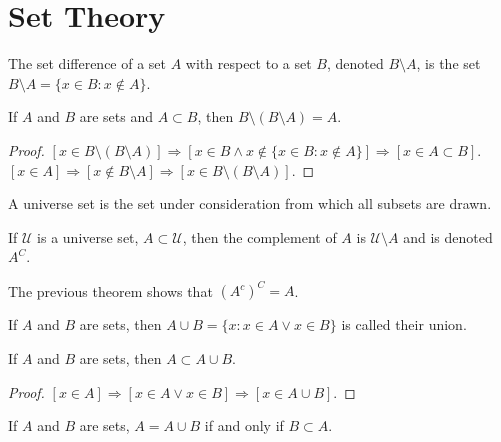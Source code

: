         \section{Set Theory}
            \begin{definition}
                The set difference of a set $A$ with respect
                to a set $B$, denoted $B\setminus{A}$, is the set
                $B\setminus{A}=\{x\in{B}:x\notin{A}\}$.
            \end{definition}
            \begin{theorem}
                If $A$ and $B$ are sets and $A\subset B$,
                then $B\setminus(B\setminus A)=A$.
            \end{theorem}
            \begin{proof}
                $[x\in B\setminus(B\setminus{A})]%
                 \Rightarrow[x\in{B}\land{x}\notin%
                 \{x\in{B}:x\notin{A}\}]%
                 \Rightarrow[x\in{A}\subset{B}]$.
                 $[x\in{A}]\Rightarrow[x\notin{B}\setminus{A}]%
                 \Rightarrow[x\in{B}\setminus(B\setminus{A})]$.
            \end{proof}
            A universe set is the set under consideration
            from which all subsets are drawn.
            \begin{definition}
                If $\mathcal{U}$ is a universe set,
                $A\subset\mathcal{U}$, then the complement of
                $A$ is $\mathcal{U}\setminus{A}$ and is
                denoted $A^{C}$.
            \end{definition}
            The previous theorem shows that $(A^c)^{C}=A$.
            \begin{definition}
                If $A$ and $B$ are sets, then
                $A\cup{B}=\{x: x\in A \lor x\in B\}$
                is called their union.
            \end{definition}
            \begin{corollary}
                If $A$ and $B$ are sets, then $A\subset{A}\cup{B}$.
            \end{corollary}
            \begin{proof}
                $[x\in A]\Rightarrow[x\in A\lor x\in B]%
                 \Rightarrow[x\in{A}\cup{B}]$.
            \end{proof}
            \begin{theorem}
                If $A$ and $B$ are sets, $A=A\cup B$
                if and only if $B\subset A$.
            \end{theorem}

